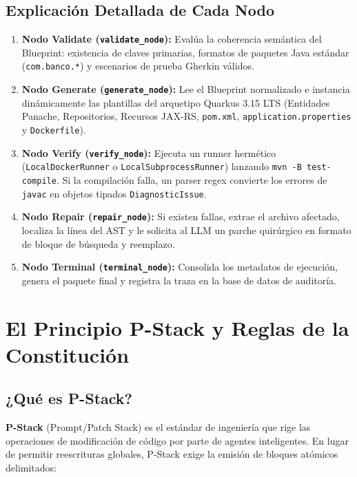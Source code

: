 \documentclass[11pt,a4paper]{report}
\begin{document}
\section{Explicación Detallada de Cada Nodo}
\begin{enumerate}[leftmargin=1.5cm]
    \item \textbf{Nodo Validate (\texttt{validate\_node}):} Evalúa la coherencia semántica del Blueprint: existencia de claves primarias, formatos de paquetes Java estándar (\texttt{com.banco.*}) y escenarios de prueba Gherkin válidos.
    \item \textbf{Nodo Generate (\texttt{generate\_node}):} Lee el Blueprint normalizado e instancia dinámicamente las plantillas del arquetipo Quarkus 3.15 LTS (Entidades Panache, Repositorios, Recursos JAX-RS, \texttt{pom.xml}, \texttt{application.properties} y \texttt{Dockerfile}).
    \item \textbf{Nodo Verify (\texttt{verify\_node}):} Ejecuta un runner hermético (\texttt{LocalDockerRunner} o \texttt{LocalSubprocessRunner}) lanzando \texttt{mvn -B test-compile}. Si la compilación falla, un parser regex convierte los errores de \texttt{javac} en objetos tipados \texttt{DiagnosticIssue}.
    \item \textbf{Nodo Repair (\texttt{repair\_node}):} Si existen fallas, extrae el archivo afectado, localiza la línea del AST y le solicita al LLM un parche quirúrgico en formato de bloque de búsqueda y reemplazo.
    \item \textbf{Nodo Terminal (\texttt{terminal\_node}):} Consolida los metadatos de ejecución, genera el paquete final y registra la traza en la base de datos de auditoría.
\end{enumerate}

\newpage

\chapter{El Principio P-Stack y Reglas de la Constitución}

\section{¿Qué es P-Stack?}
\textbf{P-Stack} (Prompt/Patch Stack) es el estándar de ingeniería que rige las operaciones de modificación de código por parte de agentes inteligentes. En lugar de permitir reescrituras globales, P-Stack exige la emisión de bloques atómicos delimitados:
\end{document}

